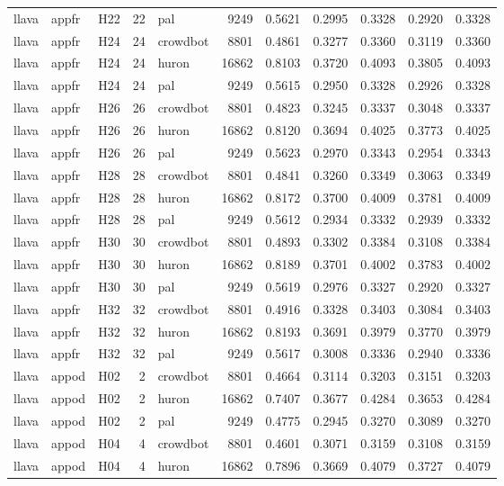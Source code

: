 \begin{table}[tbp]
\begin{tabular}{lllrlrrrrrr}
llava & appfr & H22 & 22 & pal & 9249 & 0.5621 & 0.2995 & 0.3328 & 0.2920 & 0.3328 \\
llava & appfr & H24 & 24 & crowdbot & 8801 & 0.4861 & 0.3277 & 0.3360 & 0.3119 & 0.3360 \\
llava & appfr & H24 & 24 & huron & 16862 & 0.8103 & 0.3720 & 0.4093 & 0.3805 & 0.4093 \\
llava & appfr & H24 & 24 & pal & 9249 & 0.5615 & 0.2950 & 0.3328 & 0.2926 & 0.3328 \\
llava & appfr & H26 & 26 & crowdbot & 8801 & 0.4823 & 0.3245 & 0.3337 & 0.3048 & 0.3337 \\
llava & appfr & H26 & 26 & huron & 16862 & 0.8120 & 0.3694 & 0.4025 & 0.3773 & 0.4025 \\
llava & appfr & H26 & 26 & pal & 9249 & 0.5623 & 0.2970 & 0.3343 & 0.2954 & 0.3343 \\
llava & appfr & H28 & 28 & crowdbot & 8801 & 0.4841 & 0.3260 & 0.3349 & 0.3063 & 0.3349 \\
llava & appfr & H28 & 28 & huron & 16862 & 0.8172 & 0.3700 & 0.4009 & 0.3781 & 0.4009 \\
llava & appfr & H28 & 28 & pal & 9249 & 0.5612 & 0.2934 & 0.3332 & 0.2939 & 0.3332 \\
llava & appfr & H30 & 30 & crowdbot & 8801 & 0.4893 & 0.3302 & 0.3384 & 0.3108 & 0.3384 \\
llava & appfr & H30 & 30 & huron & 16862 & 0.8189 & 0.3701 & 0.4002 & 0.3783 & 0.4002 \\
llava & appfr & H30 & 30 & pal & 9249 & 0.5619 & 0.2976 & 0.3327 & 0.2920 & 0.3327 \\
llava & appfr & H32 & 32 & crowdbot & 8801 & 0.4916 & 0.3328 & 0.3403 & 0.3084 & 0.3403 \\
llava & appfr & H32 & 32 & huron & 16862 & 0.8193 & 0.3691 & 0.3979 & 0.3770 & 0.3979 \\
llava & appfr & H32 & 32 & pal & 9249 & 0.5617 & 0.3008 & 0.3336 & 0.2940 & 0.3336 \\
llava & appod & H02 & 2 & crowdbot & 8801 & 0.4664 & 0.3114 & 0.3203 & 0.3151 & 0.3203 \\
llava & appod & H02 & 2 & huron & 16862 & 0.7407 & 0.3677 & 0.4284 & 0.3653 & 0.4284 \\
llava & appod & H02 & 2 & pal & 9249 & 0.4775 & 0.2945 & 0.3270 & 0.3089 & 0.3270 \\
llava & appod & H04 & 4 & crowdbot & 8801 & 0.4601 & 0.3071 & 0.3159 & 0.3108 & 0.3159 \\
llava & appod & H04 & 4 & huron & 16862 & 0.7896 & 0.3669 & 0.4079 & 0.3727 & 0.4079 \\

\end{tabular}
\end{table}
